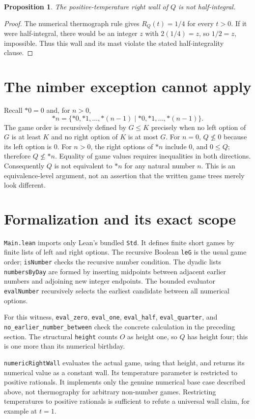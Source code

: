 \documentclass[10pt]{article}
\newtheorem{proposition}{Proposition}
\begin{document}
\begin{proposition}
The positive-temperature right wall of $Q$ is not half-integral.
\end{proposition}
\begin{proof}
The numerical thermograph rule gives $R_Q(t)=1/4$ for every $t>0$.
If it were half-integral, there would be an integer $z$ with
$2(1/4)=z$, so $1/2=z$, impossible. Thus this wall and its mast violate
the stated half-integrality clause.
\end{proof}

\section{The nimber exception cannot apply}
Recall $*0=0$ and, for $n>0$,
\[
 *n=\{*0,*1,\ldots,*(n-1)\mid*0,*1,\ldots,*(n-1)\}.
\]
The game order is recursively defined by $G\le K$ precisely when no
left option of $G$ is at least $K$ and no right option of $K$ is at most $G$.
For $n=0$, $Q\nleq0$ because its left option is $0$.
For $n>0$, the right options of $*n$ include $0$, and $0\le Q$;
therefore $Q\nleq*n$. Equality of game values requires inequalities in
both directions. Consequently $Q$ is not equivalent to $*n$ for any
natural number $n$. This is an equivalence-level argument, not an assertion
that the written game trees merely look different.

\section{Formalization and its exact scope}
\texttt{Main.lean} imports only Lean's bundled \texttt{Std}. It defines
finite short games by finite lists of left and right options. The recursive
Boolean \texttt{leG} is the usual game order; \texttt{isNumber} checks the
recursive number condition. The dyadic lists \texttt{numbersByDay} are formed
by inserting midpoints between adjacent earlier numbers and adjoining new
integer endpoints. The bounded evaluator \texttt{evalNumber} recursively
selects the earliest candidate between all numerical options.

For this witness, \texttt{eval\_zero}, \texttt{eval\_one},
\texttt{eval\_half}, \texttt{eval\_quarter}, and
\texttt{no\_earlier\_number\_between} check the concrete calculation in the
preceding section. The structural \texttt{height} counts $O$ as height one,
so $Q$ has height four; this is one more than its numerical birthday.

\texttt{numericRightWall} evaluates the actual game, using that height, and
returns its numerical value as a constant wall. Its temperature parameter
is restricted to positive rationals. It implements only the genuine
numerical base case described above, not thermography for arbitrary
non-number games. Restricting temperatures to positive rationals is
sufficient to refute a universal wall claim, for example at $t=1$.
\end{document}
